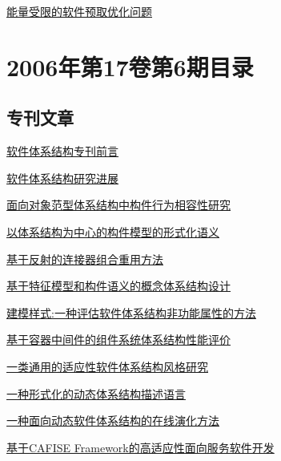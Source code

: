 \documentclass[a4paper]{article}
\begin{document}
\href{http://www.jos.org.cn/ch/reader/download_pdf.aspx?file_no=20060720&year_id=2006&quarter_id=7&falg=1}{能量受限的软件预取优化问题}


\section{\textbf{2006年第17卷第6期目录}}
\subsection{专刊文章}
\href{http://www.jos.org.cn/ch/reader/download_pdf.aspx?file_no=20060601&year_id=2006&quarter_id=6&falg=1}{软件体系结构专刊前言}

\href{http://www.jos.org.cn/ch/reader/download_pdf.aspx?file_no=20060602&year_id=2006&quarter_id=6&falg=1}{软件体系结构研究进展}

\href{http://www.jos.org.cn/ch/reader/download_pdf.aspx?file_no=20060603&year_id=2006&quarter_id=6&falg=1}{面向对象范型体系结构中构件行为相容性研究}

\href{http://www.jos.org.cn/ch/reader/download_pdf.aspx?file_no=20060604&year_id=2006&quarter_id=6&falg=1}{以体系结构为中心的构件模型的形式化语义}

\href{http://www.jos.org.cn/ch/reader/download_pdf.aspx?file_no=20060605&year_id=2006&quarter_id=6&falg=1}{基于反射的连接器组合重用方法}

\href{http://www.jos.org.cn/ch/reader/download_pdf.aspx?file_no=20060606&year_id=2006&quarter_id=6&falg=1}{基于特征模型和构件语义的概念体系结构设计}

\href{http://www.jos.org.cn/ch/reader/download_pdf.aspx?file_no=20060607&year_id=2006&quarter_id=6&falg=1}{建模样式:一种评估软件体系结构非功能属性的方法}

\href{http://www.jos.org.cn/ch/reader/download_pdf.aspx?file_no=20060608&year_id=2006&quarter_id=6&falg=1}{基于容器中间件的组件系统体系结构性能评价}

\href{http://www.jos.org.cn/ch/reader/download_pdf.aspx?file_no=20060609&year_id=2006&quarter_id=6&falg=1}{一类通用的适应性软件体系结构风格研究}

\href{http://www.jos.org.cn/ch/reader/download_pdf.aspx?file_no=20060610&year_id=2006&quarter_id=6&falg=1}{一种形式化的动态体系结构描述语言}

\href{http://www.jos.org.cn/ch/reader/download_pdf.aspx?file_no=20060611&year_id=2006&quarter_id=6&falg=1}{一种面向动态软件体系结构的在线演化方法}

\href{http://www.jos.org.cn/ch/reader/download_pdf.aspx?file_no=20060612&year_id=2006&quarter_id=6&falg=1}{基于CAFISE Framework的高适应性面向服务软件开发}
\end{document}
